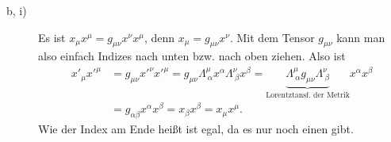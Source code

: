 \begin{description}
	\item[b, i)] Es ist $x_\mu x^\mu = g_{\mu \nu} x^\nu x^\mu$, denn $x_\mu = g_{\mu \nu} x^\nu$. Mit dem Tensor $g_{\mu \nu}$ kann man also einfach Indizes nach unten bzw. nach oben ziehen. Also ist
	\begin{align*}
		x'_\mu x'^\mu 
		&= g_{\mu \nu} x'^\nu x'^\mu 
		= g_{\mu \nu} \Lambda^\mu_{~\alpha} x^\alpha \Lambda^\nu_{~\beta} x^\beta
		= \underbrace{\Lambda^\mu_{~\alpha} g_{\mu \nu} \Lambda^\nu_{~\beta}}_{\text{Lorentztansf. der Metrik}} x^\alpha x^\beta \\
		&= g_{\alpha \beta} x^\alpha x^\beta = x_\beta x^\beta = x_\mu x^\mu
		\text{.}
	\end{align*}
	Wie der Index am Ende heißt ist egal, da es nur noch einen gibt.
\end{description}
